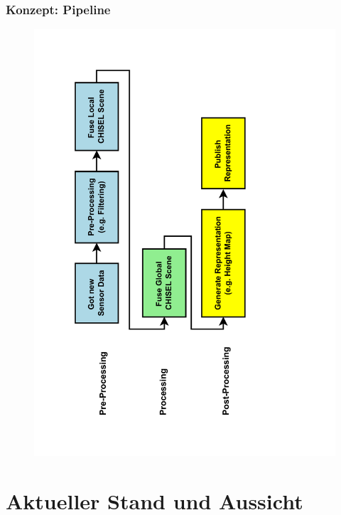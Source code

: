 \begin{frame}[c]
    \frametitle{Konzept: Pipeline}
      
    \begin{figure}[t]
      \vspace{-0.8cm}
      \includegraphics[angle=270,origin=c, width= \textwidth]{diagrams/pipeline.pdf}
      \label{fig:preprocessing_phase}
    \end{figure}
 
\end{frame}

\section{Aktueller Stand und Aussicht}


